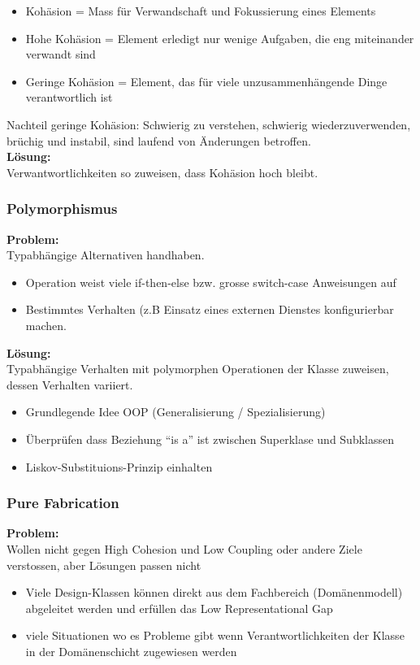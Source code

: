 \documentclass[../ZF_SWEN1.tex]{subfiles}
\begin{document}
\begin{itemize}
	\item Kohäsion = Mass für Verwandschaft und Fokussierung eines Elements
	\item Hohe Kohäsion = Element erledigt nur wenige Aufgaben, die eng miteinander verwandt sind
	\item Geringe Kohäsion = Element, das für viele unzusammenhängende Dinge verantwortlich ist
\end{itemize}
Nachteil geringe Kohäsion: Schwierig zu verstehen, schwierig wiederzuverwenden, brüchig und instabil, sind laufend von Änderungen betroffen.\\
\textbf{Lösung:\\}
Verwantwortlichkeiten so zuweisen, dass Kohäsion hoch bleibt.



\subsubsection{Polymorphismus}

\textbf{Problem:\\}
 Typabhängige Alternativen handhaben.
\begin{itemize}
	\item Operation weist viele if-then-else bzw. grosse switch-case Anweisungen auf
	\item Bestimmtes Verhalten (z.B Einsatz eines externen Dienstes konfigurierbar machen.
\end{itemize}
\textbf{Lösung:\\}
Typabhängige Verhalten mit polymorphen Operationen der Klasse zuweisen, dessen Verhalten variiert.
\begin{itemize}
	\item Grundlegende Idee OOP (Generalisierung / Spezialisierung)
	\item Überprüfen dass Beziehung "`is a"' ist zwischen Superklase und Subklassen
	\item Liskov-Substituions-Prinzip einhalten
\end{itemize}

\subsubsection{Pure Fabrication}
\textbf{Problem:\\}
Wollen nicht gegen High Cohesion und Low Coupling oder andere Ziele verstossen, aber Lösungen passen nicht
\begin{itemize}
	\item Viele Design-Klassen können direkt aus dem Fachbereich (Domänenmodell) abgeleitet werden und erfüllen das Low Representational Gap
	\item viele Situationen wo es Probleme gibt wenn Verantwortlichkeiten der Klasse in der Domänenschicht zugewiesen werden
\end{itemize}
\end{document}
